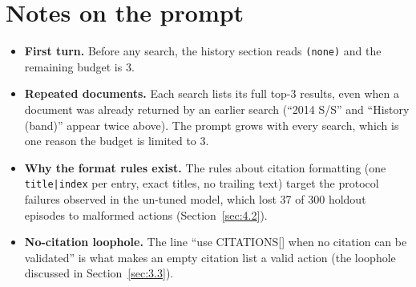 \section{Notes on the prompt}\label{notes-on-the-prompt}

\begin{itemize}
\tightlist
\item
  \textbf{First turn.} Before any search, the history section reads
  \texttt{(none)} and the remaining budget is 3.
\item
  \textbf{Repeated documents.} Each search lists its full top-3 results,
  even when a document was already returned by an earlier search (``2014
  S/S'' and ``History (band)'' appear twice above). The prompt grows
  with every search, which is one reason the budget is limited to 3.
\item
  \textbf{Why the format rules exist.} The rules about citation
  formatting (one \texttt{title|index} per entry, exact titles, no
  trailing text) target the protocol failures observed in the un-tuned
  model, which lost 37 of 300 holdout episodes to malformed actions
  (Section~\ref{sec:4.2}).
\item
  \textbf{No-citation loophole.} The line ``use CITATIONS{[}{]} when no
  citation can be validated'' is what makes an empty citation list a
  valid action (the loophole discussed in Section~\ref{sec:3.3}).
\end{itemize}
